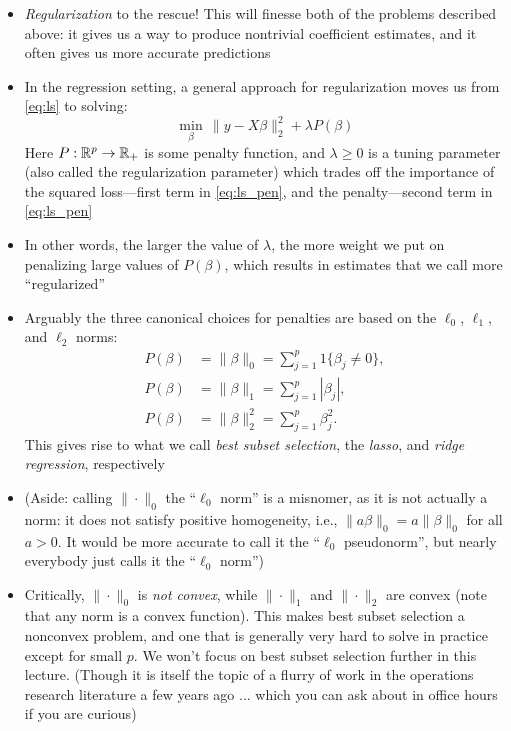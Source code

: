 \documentclass{article}
\begin{document}
\begin{itemize}
\item \emph{Regularization} to the rescue! This will finesse both of the
  problems described above: it gives us a way to produce nontrivial coefficient 
  estimates, and it often gives us more accurate predictions 

\item In the regression setting, a general approach for regularization moves us 
  from \eqref{eq:ls} to solving:
  \begin{equation}
  \label{eq:ls_pen}
  \min_\beta \, \|y - X\beta\|_2^2 + \lambda P(\beta)
  \end{equation}
  Here $P : \mathbb{R}^p \to \mathbb{R}_+$ is some penalty function, and $\lambda \geq 0$ is a
  tuning parameter (also called the regularization parameter) which trades off
  the importance of the squared loss---first term in \eqref{eq:ls_pen}, and the
  penalty---second term in \eqref{eq:ls_pen}  

\item In other words, the larger the value of $\lambda$, the more weight we put
  on penalizing large values of $P(\beta)$, which results in estimates that we
  call more ``regularized''   

\item Arguably the three canonical choices for penalties are based on the
  $\ell_0$, $\ell_1$, and $\ell_2$ norms:   
  \begin{align*}
  P(\beta) &= \|\beta\|_0 = \sum_{j=1}^p 1\{\beta_j \not= 0\}, \\
  P(\beta) &= \|\beta\|_1 = \sum_{j=1}^p |\beta_j|, \\
  P(\beta) &= \|\beta\|_2^2 = \sum_{j=1}^p \beta_j^2.
  \end{align*}
  This gives rise to what we call \emph{best subset selection}, the
  \emph{lasso}, and \emph{ridge regression}, respectively

\item (Aside: calling $\|\cdot\|_0$ the ``$\ell_0$ norm'' is a misnomer, as it
  is not actually a norm: it does not satisfy positive homogeneity, i.e.,
  $\|a\beta\|_0 = a\|\beta\|_0$ for all $a>0$. It would be more accurate to
  call it the ``$\ell_0$ pseudonorm'', but nearly everybody just calls it the
  ``$\ell_0$ norm'')

\item Critically, $\|\cdot\|_0$ is \emph{not convex}, while $\|\cdot\|_1$ and 
  $\|\cdot\|_2$ are convex (note that any norm is a convex function). This makes
  best subset selection a nonconvex problem, and one that is generally very hard
  to solve in practice except for small $p$. We won't focus on best subset 
  selection further in this lecture. (Though it is itself the topic of a flurry 
  of work in the operations research literature a few years ago ... which you
  can ask about in office hours if you are curious) 


\end{itemize}
\end{document}
